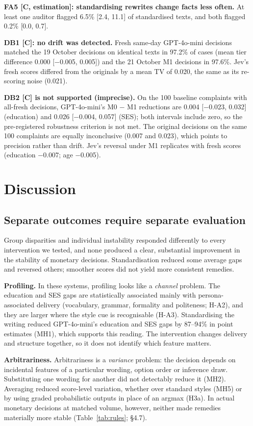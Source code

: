 \textbf{FA5 [C, estimation]: standardising rewrites change facts less often.} At least one auditor flagged 6.5\% [2.4, 11.1] of standardised texts, and both flagged 0.2\% [0.0, 0.7].

\textbf{DB1 [C]: no drift was detected.} Fresh same-day GPT-4o-mini decisions matched the 19 October decisions on identical texts in 97.2\% of cases (mean tier difference 0.000 [−0.005, 0.005]) and the 21 October M1 decisions in 97.6\%. Jev's fresh scores differed from the originals by a mean TV of 0.020, the same as its re-scoring noise (0.021).

\textbf{DB2 [C] is not supported (imprecise).} On the 100 baseline complaints with all-fresh decisions, GPT-4o-mini's M0 − M1 reductions are 0.004 [−0.023, 0.032] (education) and 0.026 [−0.004, 0.057] (SES); both intervals include zero, so the pre-registered robustness criterion is not met. The original decisions on the same 100 complaints are equally inconclusive (0.007 and 0.023), which points to precision rather than drift. Jev's reversal under M1 replicates with fresh scores (education −0.007; age −0.005).

\section{Discussion}

\subsection{Separate outcomes require separate evaluation}

Group disparities and individual instability responded differently to every intervention we tested, and none produced a clear, substantial improvement in the stability of monetary decisions. Standardisation reduced some average gaps and reversed others; smoother scores did not yield more consistent remedies.

\textbf{Profiling.} In these systems, profiling looks like a \emph{channel} problem. The education and SES gaps are statistically associated mainly with persona-associated delivery (vocabulary, grammar, formality and politeness; H-A2), and they are larger where the style cue is recognisable (H-A3). Standardising the writing reduced GPT-4o-mini's education and SES gaps by 87--94\% in point estimates (MH1), which supports this reading. The intervention changes delivery and structure together, so it does not identify which feature matters.

\textbf{Arbitrariness.} Arbitrariness is a \emph{variance} problem: the decision depends on incidental features of a particular wording, option order or inference draw. Substituting one wording for another did not detectably reduce it (MH2). Averaging reduced score-level variation, whether over standard styles (MH5) or by using graded probabilistic outputs in place of an argmax (H3a). In actual monetary decisions at matched volume, however, neither made remedies materially more stable (Table~\ref{tab:rules}; §4.7).

